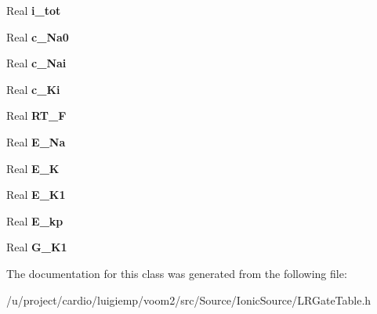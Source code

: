 \begin{DoxyCompactItemize}
\item 
\hypertarget{class_luo_rudy_gate_table_a251d6e727bba7657ac596c48cdac5ac0}{
Real {\bfseries i\_\-tot}}
\label{class_luo_rudy_gate_table_a251d6e727bba7657ac596c48cdac5ac0}

\item 
\hypertarget{class_luo_rudy_gate_table_a746142ec4c204d1a2fcd98ca1a7e570c}{
Real {\bfseries c\_\-Na0}}
\label{class_luo_rudy_gate_table_a746142ec4c204d1a2fcd98ca1a7e570c}

\item 
\hypertarget{class_luo_rudy_gate_table_a6554584f67e796b5100a671c1bcfb9ae}{
Real {\bfseries c\_\-Nai}}
\label{class_luo_rudy_gate_table_a6554584f67e796b5100a671c1bcfb9ae}

\item 
\hypertarget{class_luo_rudy_gate_table_a196360d980f5188b542e2b8ebeb70a0e}{
Real {\bfseries c\_\-Ki}}
\label{class_luo_rudy_gate_table_a196360d980f5188b542e2b8ebeb70a0e}

\item 
\hypertarget{class_luo_rudy_gate_table_a13239521e5056c1fd560c657eecb57e4}{
Real {\bfseries RT\_\-F}}
\label{class_luo_rudy_gate_table_a13239521e5056c1fd560c657eecb57e4}

\item 
\hypertarget{class_luo_rudy_gate_table_a18449666ba0bd4490fda2c5c79122bfd}{
Real {\bfseries E\_\-Na}}
\label{class_luo_rudy_gate_table_a18449666ba0bd4490fda2c5c79122bfd}

\item 
\hypertarget{class_luo_rudy_gate_table_a32cf328029420b482fd6fae9eeae660d}{
Real {\bfseries E\_\-K}}
\label{class_luo_rudy_gate_table_a32cf328029420b482fd6fae9eeae660d}

\item 
\hypertarget{class_luo_rudy_gate_table_a37897a0fae6854f3656c1b16f073b001}{
Real {\bfseries E\_\-K1}}
\label{class_luo_rudy_gate_table_a37897a0fae6854f3656c1b16f073b001}

\item 
\hypertarget{class_luo_rudy_gate_table_aa4bdeffdd714f090b8f99bb7ccf3dd27}{
Real {\bfseries E\_\-kp}}
\label{class_luo_rudy_gate_table_aa4bdeffdd714f090b8f99bb7ccf3dd27}

\item 
\hypertarget{class_luo_rudy_gate_table_ad477af94a9c0bb451123c86d7a1b6c0f}{
Real {\bfseries G\_\-K1}}
\label{class_luo_rudy_gate_table_ad477af94a9c0bb451123c86d7a1b6c0f}

\end{DoxyCompactItemize}


The documentation for this class was generated from the following file:\begin{DoxyCompactItemize}
\item 
/u/project/cardio/luigiemp/voom2/src/Source/IonicSource/LRGateTable.h\end{DoxyCompactItemize}
